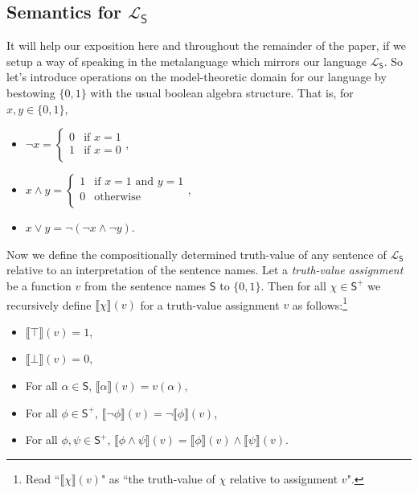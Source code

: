 \documentclass[12pt]{article}
\theoremstyle{remark}
\newcommand{\fancy}[1]{\mathcal{#1}}
\def\S{\textsf{S}}
\def\L{\fancy{L}}
\begin{document}
\subsection{Semantics for $\L_\S$}

It will help our exposition here and throughout the remainder of the paper, if we setup a way of speaking in the metalanguage which mirrors our language $\L_\S$. So let's introduce operations on the model-theoretic domain for our language by bestowing $\{0, 1\}$ with the usual boolean algebra structure. That is, for $x, y \in \{0, 1\}$, 
\begin{itemize}
\item $\neg x = \begin{cases}
0 & \text{if } x = 1 \\
1 & \text{if } x = 0 \\
\end{cases}$,
\item  $x \wedge y = \begin{cases}
1 & \text{if } x = 1 \text{ and } y = 1 \\
0 & \text{otherwise} \\
\end{cases}$,
\item $x \vee y = \neg (\neg x \wedge \neg y)$.\\
\end{itemize}

Now we define the compositionally determined truth-value of any sentence of $\L_\S$ relative to an interpretation of the sentence names. Let a \textit{truth-value assignment} be a function $v$ from the sentence names $\S$ to $\{0,1\}$. Then for all $\chi \in \S^{+}$ we recursively define $\llbracket \chi\rrbracket(v)$ for a truth-value assignment $v$ as follows:\footnote{Read ``$\llbracket \chi\rrbracket(v)$" as ``the truth-value of $\chi$ relative to assignment $v$".}

\begin{itemize}

\item $\llbracket \top \rrbracket(v) =1$,
\item $\llbracket \bot \rrbracket(v) =0$,
\item For all $\alpha\in\S$,  $\llbracket \alpha \rrbracket(v) = v(\alpha)$,
\item For all $\phi\in\S^{+}$, $\llbracket \neg\phi \rrbracket(v) = \neg \llbracket \phi \rrbracket(v)$,
\item For all $\phi, \psi \in\S^{+}$, $\llbracket \phi \wedge \psi \rrbracket(v) = \llbracket \phi \rrbracket(v) \wedge \llbracket \psi \rrbracket(v)$.
\end{itemize}
\end{document}
